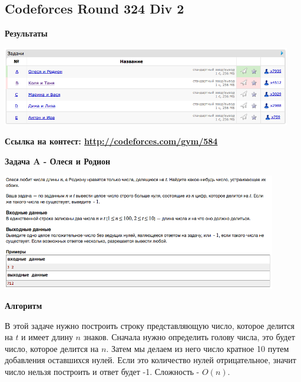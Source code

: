 \documentclass[a4paper,12pt]{article}
\begin{document}
%
%

\newpage
\subsection{Codeforces Round 324 Div 2}

\textbf{{\large Результаты}} \\
\begin{center}
\includegraphics[width=0.95\textwidth]{C_324/result.png}\\ [1cm]
\end{center}

\textbf{{\large Ссылка на контест: \url{http://codeforces.com/gym/584}}}

\newpage
\textbf{{\large Задача A - Олеся и Родион}}

\begin{center}
\includegraphics[width=0.9\textwidth]{C_324/A.png}\\ [1cm]
\end{center}

\textbf{{\large Алгоритм}}

В этой задаче нужно построить строку представляющую число, которое делится на $t$ и имеет длину $n$ знаков. Сначала нужно определить голову числа, это будет число, которое делится на $n$. Затем мы делаем из него число кратное 10 путем добавления оставшихся нулей. Если это количество нулей отрицательное, значит число нельзя построить и ответ будет -1. Сложность - $O(n)$. \\
\end{document}
